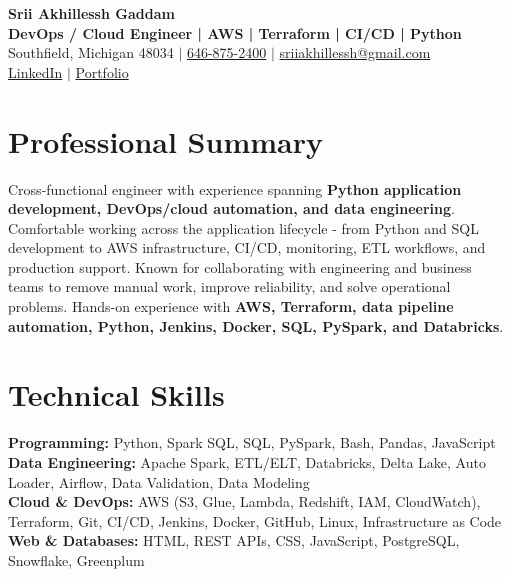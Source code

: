 \documentclass[letterpaper,10pt]{article}
\begin{document}
\fontsize{9.35pt}{10.45pt}\selectfont

\begin{center}
    {\LARGE \textbf{Srii Akhillessh Gaddam}} \\[-1pt]
    \textbf{DevOps / Cloud Engineer | AWS | Terraform | CI/CD | Python} \\[2pt]
    Southfield, Michigan 48034 $|$
    \href{tel:6468752400}{646-875-2400} $|$
    \href{mailto:sriiakhillessh@gmail.com}{sriiakhillessh@gmail.com} \\[1pt]
    \href{https://www.linkedin.com/in/srii-akhiilessh-gaddam-b48668191/}{LinkedIn} $|$
    \href{https://sriiakhillesshg.github.io/portfolio/}{Portfolio}
\end{center}
\vspace{-8pt}

\section{Professional Summary}
\small{Cross-functional engineer with experience spanning \textbf{Python application development, DevOps/cloud automation, and data engineering}. Comfortable working across the application lifecycle - from Python and SQL development to AWS infrastructure, CI/CD, monitoring, ETL workflows, and production support. Known for collaborating with engineering and business teams to remove manual work, improve reliability, and solve operational problems. Hands-on experience with \textbf{AWS, Terraform, data pipeline automation, Python, Jenkins, Docker, SQL, PySpark, and Databricks}.}

\section{Technical Skills}
\small{
\textbf{Programming:} Python, Spark SQL, SQL, PySpark, Bash, Pandas, JavaScript \\
\textbf{Data Engineering:} Apache Spark, ETL/ELT, Databricks, Delta Lake, Auto Loader, Airflow, Data Validation, Data Modeling \\
\textbf{Cloud \& DevOps:} AWS (S3, Glue, Lambda, Redshift, IAM, CloudWatch), Terraform, Git, CI/CD, Jenkins, Docker, GitHub, Linux, Infrastructure as Code \\
\textbf{Web \& Databases:} HTML, REST APIs, CSS, JavaScript, PostgreSQL, Snowflake, Greenplum
}
\end{document}
